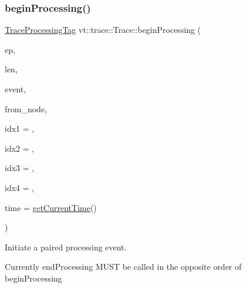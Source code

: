 \subsubsection{\texorpdfstring{begin\+Processing()}{beginProcessing()}}
{\footnotesize\ttfamily \hyperlink{structvt_1_1trace_1_1_trace_processing_tag}{Trace\+Processing\+Tag} vt\+::trace\+::\+Trace\+::begin\+Processing (\begin{DoxyParamCaption}\item[{\hyperlink{namespacevt_1_1trace_a3c14050715ba9eceaeff51fb3de64f2f}{Trace\+Entry\+I\+D\+Type} const}]{ep,  }\item[{\hyperlink{namespacevt_1_1trace_aeb598f45d67d41db7902e494f2f0ce59}{Trace\+Msg\+Len\+Type} const}]{len,  }\item[{\hyperlink{namespacevt_1_1trace_a64a7185f3e102df8d8258f263ccd1582}{Trace\+Event\+I\+D\+Type} const}]{event,  }\item[{\hyperlink{namespacevt_a866da9d0efc19c0a1ce79e9e492f47e2}{Node\+Type} const}]{from\+\_\+node,  }\item[{uint64\+\_\+t const}]{idx1 = {},  }\item[{uint64\+\_\+t const}]{idx2 = {},  }\item[{uint64\+\_\+t const}]{idx3 = {},  }\item[{uint64\+\_\+t const}]{idx4 = {},  }\item[{double const}]{time = {\ttfamily \hyperlink{structvt_1_1trace_1_1_trace_a04cf6b76b4ced1bc90d246a34c948db5}{get\+Current\+Time}()} }\end{DoxyParamCaption})}



Initiate a paired processing event. 

Currently {\ttfamily end\+Processing} M\+U\+ST be called in the opposite order of {\ttfamily begin\+Processing} 


